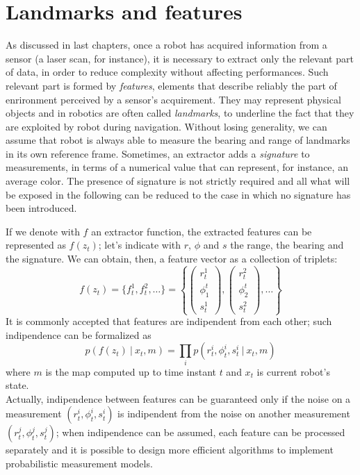 \documentclass[a4paper, onecolumn]{report}
\begin{document}
\section{Landmarks and features}
As discussed in last chapters, once a robot has acquired information from a sensor (a laser scan, for instance), it is necessary to extract only the relevant part of data, in order to reduce complexity without affecting performances. Such relevant part is formed by \emph{features}, elements that describe reliably the part of enrironment perceived by a sensor's acquirement. They may represent physical objects and in robotics are often called \emph{landmarks}, to underline the fact that they are exploited by robot during navigation. Without losing generality, we can assume that robot is always able to measure the bearing and range of landmarks in its own reference frame. Sometimes, an extractor adds a \emph{signature} to measurements, in terms of a numerical value that can represent, for instance, an average color. The presence of signature is not strictly required and all what will be exposed in the following can be reduced to the case in which no signature has been introduced.

If we denote with $f$ an extractor function, the extracted features can be represented as $f(z_t)$; let's indicate with $r$, $\phi$ and $s$ the range, the bearing and the signature. We can obtain, then, a feature vector as a collection of triplets:
\begin{equation}
	f(z_t) = \{f_t^1, f_t^2, \dots \} =\left \{ \left( \begin{matrix} r_t^1 \\ \phi_1^t \\ s_t^1 \end{matrix} \right),  \left(\begin{matrix} r_t^2 \\ \phi_2^t \\ s_t^2 \end{matrix} \right), \dots \right\}
\end{equation}
It is commonly accepted that features are indipendent from each other; such indipendence can be formalized as
\begin{equation}
	p(f(z_t) \: | \: x_t, m) = \prod_i p(r_t^i, \phi_t^i, s_t^i \: | \: x_t, m)
\end{equation}
where $m$ is the map computed up to time instant $t$ and $x_t$ is current robot's state. \\
Actually, indipendence between features can be guaranteed only if the noise on a measurement $(r_t^i, \phi_t^i, s_t^i)$ is indipendent from the noise on another measurement $(r_t^j, \phi_t^j, s_t^j)$; when indipendence can be assumed, each feature can be processed separately and it is possible to design more efficient algorithms to implement probabilistic measurement models. 
\end{document}
